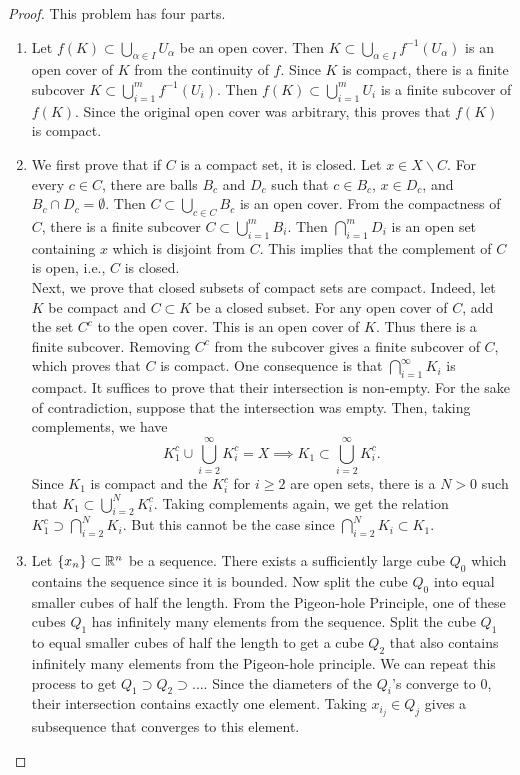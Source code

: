 \documentclass[12pt]{article}
\begin{document}
\begin{proof}
	This problem has four parts. 
	\begin{enumerate}[label = (\alph*)]
		\item Let $f(K) \subset \bigcup_{\alpha \in I} U_\alpha$ be an open cover. Then $K \subset \bigcup_{\alpha \in I} f^{-1}(U_\alpha)$	is an open cover of $K$ from the continuity of $f$. Since $K$ is compact, there is a finite subcover $K \subset \bigcup_{i = 1}^m f^{-1}(U_i)$. Then $f(K) \subset \bigcup_{i = 1}^m U_i$ is a finite subcover of $f(K)$. Since the original open cover was arbitrary, this proves that $f(K)$ is compact. 

		\item We first prove that if $C$ is a compact set, it is closed. Let $x \in X \backslash C$. For every $c \in C$, there are balls $B_c$ and $D_c$ such that $c \in B_c$, $x \in D_c$, and $B_c \cap D_c = \emptyset$. Then $C \subset \bigcup_{c \in C} B_c$ is an open cover. From the compactness of $C$, there is a finite subcover $C \subset \bigcup_{i = 1}^m B_i$. Then $\bigcap_{i = 1}^m D_i$ is an open set containing $x$ which is disjoint from $C$. This implies that the complement of $C$ is open, i.e., $C$ is closed. \\

		Next, we prove that closed subsets of compact sets are compact. Indeed, let $K$ be compact and $C \subset K$ be a closed subset. For any open cover of $C$, add the set $C^c$ to the open cover. This is an open cover of $K$. Thus there is a finite subcover. Removing $C^c$ from the subcover gives a finite subcover of $C$, which proves that $C$ is compact. One consequence is that $\bigcap_{i = 1}^\infty K_i$ is compact. It suffices to prove that their intersection is non-empty. For the sake of contradiction, suppose that the intersection was empty. Then, taking complements, we have
		\[
			K_1^c \cup \bigcup_{i = 2}^\infty K_i^c = X \implies K_1 \subset \bigcup_{i = 2}^\infty K_i^c.
		\]
		Since $K_1$ is compact and the $K_i^c$ for $i \geq 2$ are open sets, there is a $N > 0$ such that $K_1 \subset \bigcup_{i = 2}^N K_i^c$. Taking complements again, we get the relation $K_1^c \supset \bigcap_{i = 2}^N K_i$. But this cannot be the case since $\bigcap_{i = 2}^N K_i \subset K_1$.


		\item Let $\{x_n\} \subset \mathbb{R}^n$ be a sequence. There exists a sufficiently large cube $Q_0$ which contains the sequence since it is bounded. Now split the cube $Q_0$ into equal smaller cubes of half the length. From the Pigeon-hole Principle, one of these cubes $Q_1$ has infinitely many elements from the sequence. Split the cube $Q_1$ to equal smaller cubes of half the length to get a cube $Q_2$ that also contains infinitely many elements from the Pigeon-hole principle. We can repeat this process to get $Q_1 \supset Q_2 \supset \ldots$. Since the diameters of the $Q_i$'s converge to $0$, their intersection contains exactly one element. Taking $x_{i_j} \in Q_j$ gives a subsequence that converges to this element. 


\end{enumerate}
\end{proof}
\end{document}
